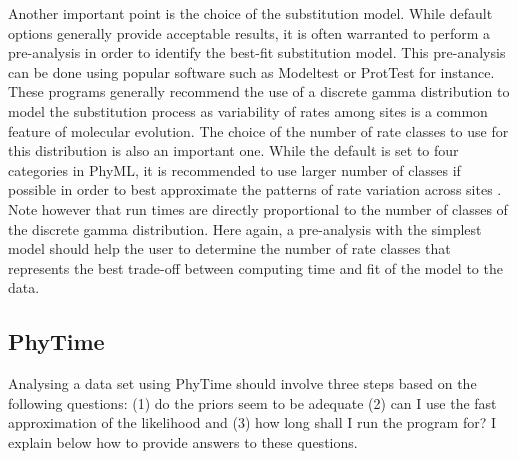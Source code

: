 \documentclass[a4paper,12pt]{article}
\begin{document}
Another important  point is the  choice of the  substitution model. While default  options generally
provide acceptable results, it is often warranted to perform a pre-analysis in order to identify the
best-fit substitution model.  This pre-analysis can be done using popular software such as Modeltest
\cite{posada98} or ProtTest  \cite{abascal05} for instance.  These programs  generally recommend the
use of a discrete gamma distribution to model the substitution process as variability of rates among
sites is a common  feature of molecular evolution.  The choice of the number  of rate classes to use
for this  distribution is  also an important  one. While the  default is  set to four  categories in
PhyML, it is  recommended to use larger number  of classes if possible in order  to best approximate
the  patterns of rate  variation across  sites \cite{galtier04}.   Note however  that run  times are
directly proportional to  the number of classes  of the discrete gamma distribution.   Here again, a
pre-analysis with the  simplest model should help the  user to determine the number  of rate classes
that represents the best trade-off between computing time and fit of the model to the data.


\subsection{PhyTime}\label{sec:recomphytime}

Analysing a data set using PhyTime should  involve three steps based on the following questions: (1)
do the priors seem to be adequate (2) can I use the fast approximation of the likelihood and (3) how
long shall I run the program for? I explain below how to provide answers to these questions.
\end{document}

